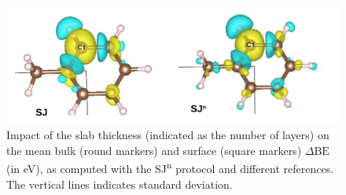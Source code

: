 \documentclass[%
aip,
amsmath,amssymb,
preprint,%
]{revtex4-2}
\def\dbe{\ensuremath{\Delta\text{BE}}}
\begin{document}
\begin{figure}[!h]
\centering
\includegraphics[width=\linewidth]{FigureS4}
\caption{Impact of the slab thickness (indicated as the number of layers) on the mean bulk (round markers)  and surface (square markers) \dbe{} (in \si{\electronvolt}), as computed with the SJ\textsuperscript{n} protocol and different references. The vertical lines indicates standard deviation.}
\label{fig:slabsthicknessSJn}
\end{figure}
\end{document}
